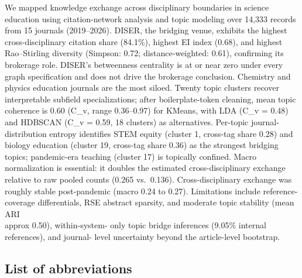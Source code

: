 \documentclass[pdflatex,sn-apa]{sn-jnl}
\begin{document}
We mapped knowledge exchange across disciplinary boundaries in science
education using citation-network analysis and topic modeling over 14,333
records from 15 journals (2019--2026). DISER, the bridging venue,
exhibits the highest cross-disciplinary citation share (84.1\%), highest
EI index (0.68), and highest Rao--Stirling diversity (Simpson: 0.72;
distance-weighted: 0.61), confirming its brokerage role. DISER's
betweenness centrality is at or near zero under every graph
specification and does not drive the brokerage conclusion. Chemistry and
physics education journals are the most siloed. Twenty topic clusters
recover interpretable subfield specializations; after boilerplate-token
cleaning, mean topic coherence is 0.60 (C\_v, range 0.36--0.97) for
KMeans, with LDA (C\_v = 0.48) and HDBSCAN (C\_v = 0.59, 18 clusters) as
alternatives. Per-topic journal-distribution entropy identifies STEM
equity (cluster 1, cross-tag share 0.28) and biology education (cluster
19, cross-tag share 0.36) as the strongest bridging topics; pandemic-era
teaching (cluster 17) is topically confined. Macro normalization is
essential: it doubles the estimated cross-disciplinary exchange relative
to raw pooled counts (0.265 vs.~0.136). Cross-disciplinary exchange was
roughly stable post-pandemic (macro 0.24 to 0.27). Limitations include
reference-coverage differentials, RSE abstract sparsity, and moderate
topic stability (mean ARI \\approx 0.50), within-system- only topic bridge
inferences (9.05\% internal references), and journal- level uncertainty
beyond the article-level bootstrap.

\subsection{List of abbreviations}\label{list-of-abbreviations}
\end{document}

